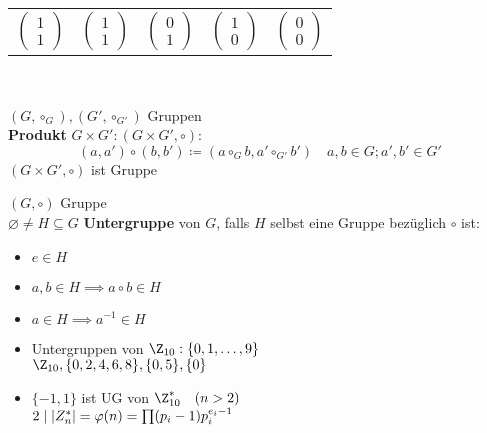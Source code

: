 \begin{tabular}{ c | c c c c }
	$\begin{pmatrix}1\\1\end{pmatrix}$		&$\begin{pmatrix}1\\1\end{pmatrix}$	&$\begin{pmatrix}0\\1\end{pmatrix}$		&$\begin{pmatrix}1\\0\end{pmatrix}$	&$\begin{pmatrix}0\\0\end{pmatrix}$	
\end{tabular}\\
\begin{def*}[note = Produkt , index = Produkt]
	$(G , \circ_G) , (G' , \circ_{G'})$ Gruppen \\
	\textbf{Produkt} $G \times G' : (G \times G' , \circ ):$ \\
	\[ (a,a') \circ (b,b') \coloneqq (a \circ_G b , a' \circ_{G'} b') \quad a , b \in G ; a' , b' \in G' \]
	$(G \times G' , \circ)$ ist Gruppe
\end{def*}
\begin{def*}[note = Untergruppe , index = Untergruppe]
	$(G , \circ)$ Gruppe \\
	$\varnothing \neq H \subseteq G$ \textbf{Untergruppe} von $G$, falls $H$ selbst eine Gruppe bezüglich $\circ$ ist:
	\begin{itemize}
		\item $e \in H$
		\item $a , b \in H \implies a \circ b \in H$
		\item $a \in H \implies a^{-1} \in H$
	\end{itemize}
\end{def*}
\begin{bsp*}
	\begin{itemize}
		\item Untergruppen von $\Z_{10} : \{ 0 , 1 , \dotsc , 9 \}$ \\
			$\Z_{10} , \{ 0, 2, 4, 6, 8 \} , \{ 0, 5 \} , \{ 0 \}$
		\item $\{ -1 , 1 \}$ ist UG von $\Z_{10}^* \quad (n > 2)$ \\
			$2 \mid \abs{Z_n^*} = \varphi(n) = \prod (p_i -1) p_i^{e_i - 1}$
	\end{itemize}
\end{bsp*}
